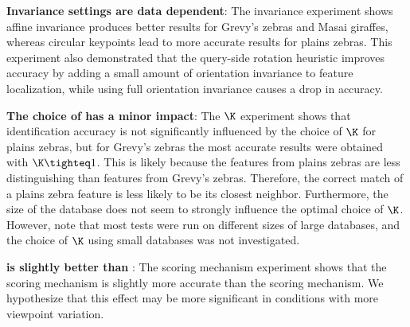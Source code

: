 \begin{itemln}
            \item \textbf{Invariance settings are data dependent}:
                The invariance experiment shows
                affine invariance produces better results for Grevy's
                  zebras and Masai giraffes, whereas circular keypoints
                  lead to more accurate results for plains zebras.
                This experiment also demonstrated that the query-side
                  rotation heuristic improves accuracy by adding a small
                  amount of orientation invariance to feature
                  localization, while using full orientation invariance
                  causes a drop in accuracy.

              \item \textbf{The choice of \K{} has a minor impact}: 
                The $\K$ experiment shows that identification accuracy
                  is not significantly influenced by the choice of $\K$
                  for plains zebras, but for Grevy's zebras the most
                  accurate results were obtained with $\K\tighteq1$.
                This is likely because the features from plains zebras
                  are less distinguishing than features from Grevy's
                  zebras.
                Therefore, the correct match of a plains zebra feature
                  is less likely to be its closest neighbor.
                Furthermore, the size of the database does not seem to
                  strongly influence the optimal choice of $\K$.
                However, note that most tests were run on different
                  sizes of large databases, and the choice of $\K$ using
                  small databases was not investigated.

              \item \textbf{\Nsumprefix{} is slightly better than \csumprefix{} \namescoring{}}:
                The scoring mechanism experiment shows that the
                  \nsumprefix{} scoring mechanism is slightly more
                  accurate than the \csumprefix{} scoring mechanism.
                We hypothesize that this effect may be more significant
                  in conditions with more viewpoint variation.


\end{itemln}
